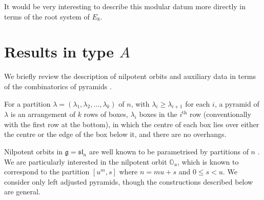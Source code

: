 \documentclass[12pt]{amsart}
\theoremstyle{plain}
\theoremstyle{definition}
\numberwithin{equation}{section}
\newcommand{\la}{\lambda}
\newcommand{\g}{\mathfrak{g}}
\newcommand{\sll}{\mathfrak{sl}}
\newcommand{\mbo}{\mathbb{O}}
\begin{document}
It would be very interesting to describe this modular datum more directly in terms of the root system of $E_8$.



\section{Results in type $A$}\label{sec:type.A}


We briefly review the description of nilpotent orbits and auxiliary data in terms of the combinatorics of pyramids \cite{CMcG, EK, BK}.

For a partition $\la = (\la_1, \la_2, \ldots, \la_k)$ of $n$, with $\la_i \geq \la_{i+1}$ for each $i$, a pyramid of $\la$ is an arrangement of $k$ rows of boxes, $\la_i$ boxes in the $i^{\text{th}}$ row (conventionally with the first row at the bottom), in which the centre of each box lies over either the centre or the edge of the box below it, and there are no overhangs.

Nilpotent orbits in $\g = \sll_n$ are well known to be parametrised by partitions of $n$ \cite{CMcG}. We are particularly interested in the nilpotent orbit $\mbo_u$, which is known \cite{Arakawa2015} to correspond to the partition $[u^m, s]$ where $n = mu+s$ and $0 \leq s < u$. We consider only left adjusted pyramids, though the constructions described below are general.
\end{document}
